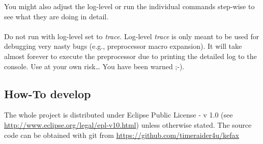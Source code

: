 You might also adjust the log-level or run the individual commands step-wise to see what they are doing in detail.
\\ \ \\
\warning{} Do not run with log-level set to {\it trace}. 
Log-level {\it trace} is only meant to be used for debugging very nasty bugs 
(e.g., preprocessor macro expansion).
It will take almost forever to execute the preprocessor due to printing the detailed log to the console.
Use at your own risk\dots{} You have been warned ;-).

\FloatBarrier

\subsection{How-To develop}
The whole project is distributed under Eclipse Public License - v 1.0 
 (see \url{http://www.eclipse.org/legal/epl-v10.html}\cite{EPL_URL}) unless otherwise stated.
The source code can be obtained  with git from \url{https://github.com/timeraider4u/kefax}\cite{Kefax2_URL}
